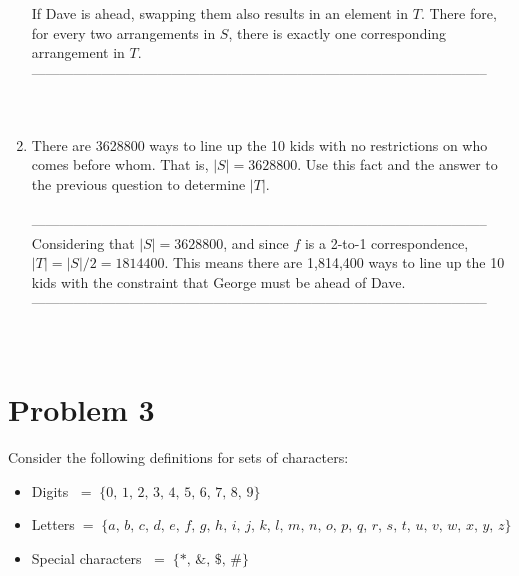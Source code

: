 \documentclass{amsart}
\theoremstyle{definition}
\theoremstyle{Exercise}
\theoremstyle{remark}
\theoremstyle{rule}
\numberwithin{equation}{section}
\begin{document}
\begin{enumerate}[label=(\alph*)]
If Dave is ahead, swapping them also results in an element in $T$. There fore, for every two arrangements in $S$, there is exactly one corresponding arrangement in $T$.\\
--------------------------------------------------------------------------------------------------\\
\\\\
  \item There are 3628800 ways to line up the 10 kids with no restrictions on who comes before whom. That is, $|S| =3628800$. Use this fact and the answer to the previous question to determine $|T|$.\\\\
--------------------------------------------------------------------------------------------------\\
Considering that $|S| = 3628800$, and since $f$ is a 2-to-1 correspondence, $|T| = |S| / 2 = 1814400$. This means there are 1,814,400 ways to line up the 10 kids with the constraint that George must be ahead of Dave.\\
--------------------------------------------------------------------------------------------------\\
\\\\
\end{enumerate}
   \newpage

\section*{Problem 3}
   
   
Consider the following definitions for sets of characters:
\begin{itemize}
  \item Digits $\;=\; \{ 0,\, 1,\, 2,\, 3,\, 4,\, 5,\, 6,\, 7,\, 8,\, 9 \}$\\
  \item Letters$\; = \;\{ a,\, b,\, c, \,d,\, e,\, f,\, g,\, h,\, i,\, j,\, k,\, l,\, m,\, n,\, o,\, p,\, q,\, r,\, s,\, t,\, u,\, v,\, w,\, x,\, y,\, z \}$\\
  \item Special characters $\;=\; \{ *,\, \&,\, \$,\, \# \}$\\
\end{itemize}
\end{document}
